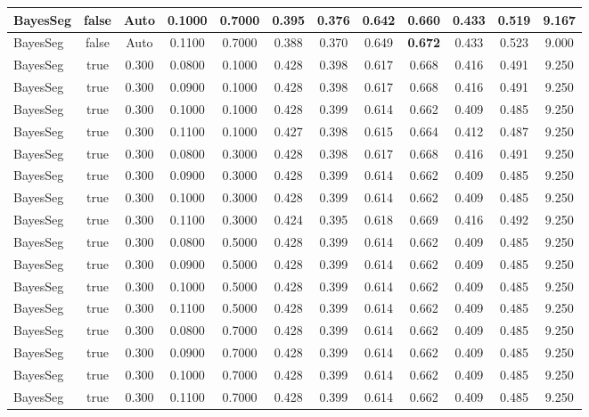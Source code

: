 \documentclass{article}
\begin{document}
\begin{longtable}[c]{|l|c|c|c|c|c|c|c|c|c|c|c|}
 BayesSeg & false & Auto & 0.1000 & 0.7000 & 0.395 & 0.376 & 0.642 & 0.660 & 0.433 & 0.519 & 9.167  \\ \hline 
 BayesSeg & false & Auto & 0.1100 & 0.7000 & 0.388 & 0.370 & 0.649 & \cellcolor{gray!20} \textbf{0.672} & 0.433 & 0.523 & 9.000  \\ \hline 
 BayesSeg & true & 0.300 & 0.0800 & 0.1000 & 0.428 & 0.398 & 0.617 & 0.668 & 0.416 & 0.491 & 9.250  \\ \hline 
 BayesSeg & true & 0.300 & 0.0900 & 0.1000 & 0.428 & 0.398 & 0.617 & 0.668 & 0.416 & 0.491 & 9.250  \\ \hline 
 BayesSeg & true & 0.300 & 0.1000 & 0.1000 & 0.428 & 0.399 & 0.614 & 0.662 & 0.409 & 0.485 & 9.250  \\ \hline 
 BayesSeg & true & 0.300 & 0.1100 & 0.1000 & 0.427 & 0.398 & 0.615 & 0.664 & 0.412 & 0.487 & 9.250  \\ \hline 
 BayesSeg & true & 0.300 & 0.0800 & 0.3000 & 0.428 & 0.398 & 0.617 & 0.668 & 0.416 & 0.491 & 9.250  \\ \hline 
 BayesSeg & true & 0.300 & 0.0900 & 0.3000 & 0.428 & 0.399 & 0.614 & 0.662 & 0.409 & 0.485 & 9.250  \\ \hline 
 BayesSeg & true & 0.300 & 0.1000 & 0.3000 & 0.428 & 0.399 & 0.614 & 0.662 & 0.409 & 0.485 & 9.250  \\ \hline 
 BayesSeg & true & 0.300 & 0.1100 & 0.3000 & 0.424 & 0.395 & 0.618 & 0.669 & 0.416 & 0.492 & 9.250  \\ \hline 
 BayesSeg & true & 0.300 & 0.0800 & 0.5000 & 0.428 & 0.399 & 0.614 & 0.662 & 0.409 & 0.485 & 9.250  \\ \hline 
 BayesSeg & true & 0.300 & 0.0900 & 0.5000 & 0.428 & 0.399 & 0.614 & 0.662 & 0.409 & 0.485 & 9.250  \\ \hline 
 BayesSeg & true & 0.300 & 0.1000 & 0.5000 & 0.428 & 0.399 & 0.614 & 0.662 & 0.409 & 0.485 & 9.250  \\ \hline 
 BayesSeg & true & 0.300 & 0.1100 & 0.5000 & 0.428 & 0.399 & 0.614 & 0.662 & 0.409 & 0.485 & 9.250  \\ \hline 
 BayesSeg & true & 0.300 & 0.0800 & 0.7000 & 0.428 & 0.399 & 0.614 & 0.662 & 0.409 & 0.485 & 9.250  \\ \hline 
 BayesSeg & true & 0.300 & 0.0900 & 0.7000 & 0.428 & 0.399 & 0.614 & 0.662 & 0.409 & 0.485 & 9.250  \\ \hline 
 BayesSeg & true & 0.300 & 0.1000 & 0.7000 & 0.428 & 0.399 & 0.614 & 0.662 & 0.409 & 0.485 & 9.250  \\ \hline 
 BayesSeg & true & 0.300 & 0.1100 & 0.7000 & 0.428 & 0.399 & 0.614 & 0.662 & 0.409 & 0.485 & 9.250  \\ \hline 

\end{longtable}
\end{document}
